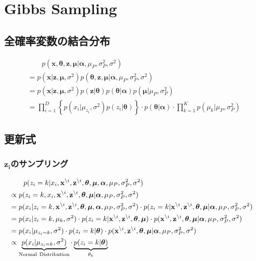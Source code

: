 \documentclass[a4paper,10.5pt,uplatex]{jsarticle}  %
\newcommand{\btheta}{\boldsymbol{\theta}}
\newcommand{\balpha}{\boldsymbol{\alpha}}
\newcommand{\bmu}{\boldsymbol{\mu}}
\newcommand{\bz}{\mathbf{z}}
\newcommand{\bx}{\mathbf{x}}
\newcommand{\deli}{{\backslash i}}
\begin{document}
\section{Gibbs Sampling}
\subsection{全確率変数の結合分布}
\begin{align}
  &\quad\quad p(\bx, \btheta, \bz, \bmu | \balpha, \mu_P, \sigma^2_P, \sigma^2)\\
  &= p(\bx | \bz, \bmu, \sigma^2) p(\btheta, \bz, \bmu | \balpha, \mu_P, \sigma^2_P, \sigma^2)\\
  &= p(\bx | \bz, \bmu, \sigma^2) p(\bz|\btheta)p(\btheta|\balpha)p(\bmu|\mu_P, \sigma^2_P)\\[3pt]
  &= \prod_{i=1}^{D} \left\{ p(x_i | \mu_{z_i}, \sigma^2) p(z_i|\btheta) \right\} \cdot p(\btheta|\balpha) \cdot \prod_{k=1}^{K} p(\mu_k | \mu_P, \sigma_P^2)
\end{align}

\subsection{更新式}
\subsubsection{$\boldsymbol{z_i}$のサンプリング}
\begin{align}
  &\qquad p(z_i = k | x_i, \bx^\deli, \bz^\deli, \btheta, \bmu, \balpha, \mu_P, \sigma^2_P, \sigma^2)\\
  &\propto p(z_i=k, x_i, \bx^\deli, \bz^\deli, \btheta, \bmu | \balpha, \mu_P, \sigma^2_P, \sigma^2)\\
&= p(x_i|z_i=k, \bx^\deli, \bz^\deli, \btheta, \bmu, \balpha, \mu_P, \sigma^2_P, \sigma^2) \cdot p(z_i=k | \bx^\deli, \bz^\deli, \btheta, \bmu | \balpha, \mu_P, \sigma^2_P, \sigma^2)\\
  &= p(x_i| z_i=k, \mu_k, \sigma^2) \cdot p(z_i=k | \bx^\deli, \bz^\deli, \btheta, \bmu) \cdot p(\bx^\deli, \bz^\deli, \btheta, \bmu | \balpha, \mu_P, \sigma^2_P, \sigma^2)\\
  &= p(x_i | \mu_{z_i=k}, \sigma^2) \cdot p(z_i=k | \btheta) \cdot p(\bx^\deli, \bz^\deli, \btheta, \bmu | \balpha, \mu_P, \sigma^2_P, \sigma^2)\\
  &\propto \underbrace{p(x_i |  \mu_{z_i=k}, \sigma^2)}_{\rm Normal \ Distribution} \cdot \underbrace{ p(z_i=k | \btheta) }_{\theta_k}
\end{align}
\end{document}
